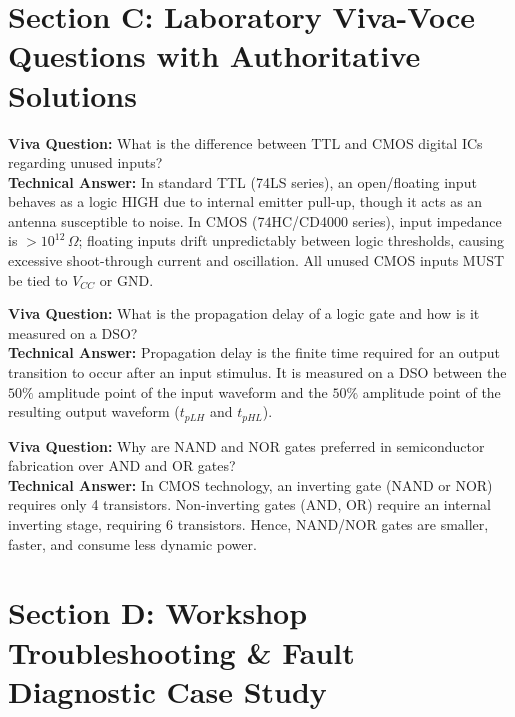 \section{Section C: Laboratory Viva-Voce Questions with Authoritative Solutions}

\noindent\textbf{Viva Question:} What is the difference between TTL and CMOS digital ICs regarding unused inputs?\\
\textbf{Technical Answer:} In standard TTL (74LS series), an open/floating input behaves as a logic HIGH due to internal emitter pull-up, though it acts as an antenna susceptible to noise. In CMOS (74HC/CD4000 series), input impedance is $> 10^{12}\,\Omega$; floating inputs drift unpredictably between logic thresholds, causing excessive shoot-through current and oscillation. All unused CMOS inputs MUST be tied to $V_{CC}$ or GND.
\vspace{3mm}

\noindent\textbf{Viva Question:} What is the propagation delay of a logic gate and how is it measured on a DSO?\\
\textbf{Technical Answer:} Propagation delay is the finite time required for an output transition to occur after an input stimulus. It is measured on a DSO between the $50\%$ amplitude point of the input waveform and the $50\%$ amplitude point of the resulting output waveform ($t_{pLH}$ and $t_{pHL}$).
\vspace{3mm}

\noindent\textbf{Viva Question:} Why are NAND and NOR gates preferred in semiconductor fabrication over AND and OR gates?\\
\textbf{Technical Answer:} In CMOS technology, an inverting gate (NAND or NOR) requires only 4 transistors. Non-inverting gates (AND, OR) require an internal inverting stage, requiring 6 transistors. Hence, NAND/NOR gates are smaller, faster, and consume less dynamic power.
\vspace{3mm}


\section{Section D: Workshop Troubleshooting \& Fault Diagnostic Case Study}

